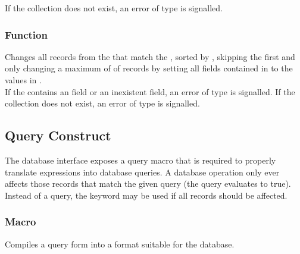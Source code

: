 \noindent If the collection does not exist, an error of type  is signalled. 

\subsubsection{Function }
Changes all records from the  that match the , sorted by , skipping the first  and only changing a maximum of  of records by setting all fields contained in  to the values in . \\

\noindent If the  contains an  field or an inexistent field, an error of type  is signalled. If the collection does not exist, an error of type  is signalled. 

\subsection{Query Construct}
The database interface exposes a query macro that is required to properly translate expressions into database queries. A database operation only ever affects those records that match the given query (the query evaluates to true). Instead of a query, the  keyword may be used if all records should be affected.

\subsubsection{Macro }
Compiles a query form into a format suitable for the database. \\

